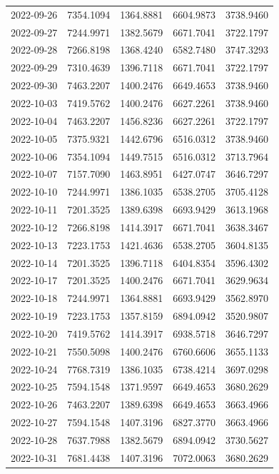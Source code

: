 \begin{footnotesize}
\begin{longtable}{lllll}
2022-09-26 & 7354.1094 & 1364.8881 & 6604.9873 & 3738.9460 \\
2022-09-27 & 7244.9971 & 1382.5679 & 6671.7041 & 3722.1797 \\
2022-09-28 & 7266.8198 & 1368.4240 & 6582.7480 & 3747.3293 \\
2022-09-29 & 7310.4639 & 1396.7118 & 6671.7041 & 3722.1797 \\
2022-09-30 & 7463.2207 & 1400.2476 & 6649.4653 & 3738.9460 \\
2022-10-03 & 7419.5762 & 1400.2476 & 6627.2261 & 3738.9460 \\
2022-10-04 & 7463.2207 & 1456.8236 & 6627.2261 & 3722.1797 \\
2022-10-05 & 7375.9321 & 1442.6796 & 6516.0312 & 3738.9460 \\
2022-10-06 & 7354.1094 & 1449.7515 & 6516.0312 & 3713.7964 \\
2022-10-07 & 7157.7090 & 1463.8951 & 6427.0747 & 3646.7297 \\
2022-10-10 & 7244.9971 & 1386.1035 & 6538.2705 & 3705.4128 \\
2022-10-11 & 7201.3525 & 1389.6398 & 6693.9429 & 3613.1968 \\
2022-10-12 & 7266.8198 & 1414.3917 & 6671.7041 & 3638.3467 \\
2022-10-13 & 7223.1753 & 1421.4636 & 6538.2705 & 3604.8135 \\
2022-10-14 & 7201.3525 & 1396.7118 & 6404.8354 & 3596.4302 \\
2022-10-17 & 7201.3525 & 1400.2476 & 6671.7041 & 3629.9634 \\
2022-10-18 & 7244.9971 & 1364.8881 & 6693.9429 & 3562.8970 \\
2022-10-19 & 7223.1753 & 1357.8159 & 6894.0942 & 3520.9807 \\
2022-10-20 & 7419.5762 & 1414.3917 & 6938.5718 & 3646.7297 \\
2022-10-21 & 7550.5098 & 1400.2476 & 6760.6606 & 3655.1133 \\
2022-10-24 & 7768.7319 & 1386.1035 & 6738.4214 & 3697.0298 \\
2022-10-25 & 7594.1548 & 1371.9597 & 6649.4653 & 3680.2629 \\
2022-10-26 & 7463.2207 & 1389.6398 & 6649.4653 & 3663.4966 \\
2022-10-27 & 7594.1548 & 1407.3196 & 6827.3770 & 3663.4966 \\
2022-10-28 & 7637.7988 & 1382.5679 & 6894.0942 & 3730.5627 \\
2022-10-31 & 7681.4438 & 1407.3196 & 7072.0063 & 3680.2629 \\

\end{longtable}
\end{footnotesize}
